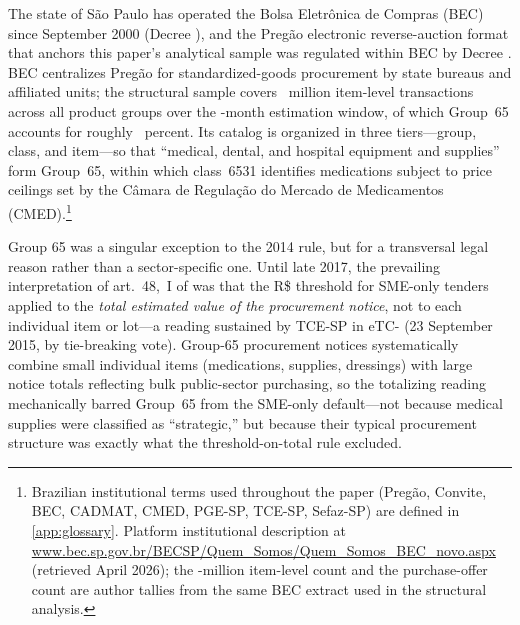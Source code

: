 The state of São Paulo has operated the Bolsa Eletrônica de Compras (BEC) since September 2000 (Decree \decreeBECOne), and the Pregão electronic reverse-auction format that anchors this paper's analytical sample was regulated within BEC by Decree \decreePregao. BEC centralizes Pregão for standardized-goods procurement by state bureaus and affiliated units; the structural sample covers \itemTransactionsCount{}~million item-level transactions across all product groups over the \nDataMonths-month estimation window, of which Group~65 accounts for roughly \groupSixtyfivePctTx{}~percent. Its catalog is organized in three tiers---group, class, and item---so that ``medical, dental, and hospital equipment and supplies'' form Group~65, within which class~6531 identifies medications subject to price ceilings set by the Câmara de Regulação do Mercado de Medicamentos (CMED).\footnote{Brazilian institutional terms used throughout the paper (Pregão, Convite, BEC, CADMAT, CMED, PGE-SP, TCE-SP, Sefaz-SP) are defined in \ref{app:glossary}. Platform institutional description at \url{www.bec.sp.gov.br/BECSP/Quem_Somos/Quem_Somos_BEC_novo.aspx} (retrieved April 2026); the \itemTransactionsCount-million item-level count and the \purchaseOffersCount{} purchase-offer count are author tallies from the same BEC extract used in the structural analysis.}

Group 65 was a singular exception to the 2014 rule, but for a transversal legal reason rather than a sector-specific one. Until late 2017, the prevailing interpretation of art.~48,~I of \LCSmeStatute{} was that the R\$\setAsideThreshBRL{} threshold for SME-only tenders applied to the \emph{total estimated value of the procurement notice}, not to each individual item or lot---a reading sustained by TCE-SP in eTC-\eTCRestrictive{} (23 September 2015, by tie-breaking vote). Group-65 procurement notices systematically combine small individual items (medications, supplies, dressings) with large notice totals reflecting bulk public-sector purchasing, so the totalizing reading mechanically barred Group~65 from the SME-only default---not because medical supplies were classified as ``strategic,'' but because their typical procurement structure was exactly what the threshold-on-total rule excluded.

